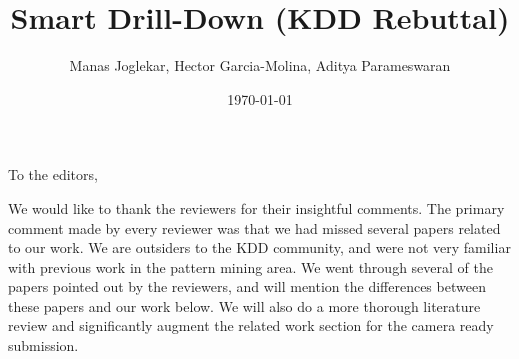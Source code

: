 \documentclass{article}
\date{\today}
\begin{document}
\title{Smart Drill-Down (KDD Rebuttal)}
\author{Manas Joglekar, Hector Garcia-Molina, Aditya Parameswaran}
\maketitle
To the editors,

We would like to thank the reviewers for their insightful comments. The primary comment made by every reviewer was that we had missed several papers related to our work. We are outsiders to the KDD community, and were not very familiar with previous work in the pattern mining area. We went through several of the papers pointed out by the reviewers, and will mention the differences between these papers and our work below. We will also do a more thorough literature review and significantly augment the related work section for the camera ready submission. 
\end{document}
